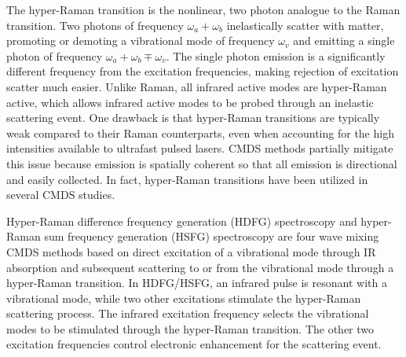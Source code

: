 \documentclass[aip, jcp, reprint, onecolumn]{revtex4-2}
\begin{document}
The hyper-Raman transition is the nonlinear, two photon analogue to the Raman transition.\cite{Terhune1965, Cyvin1965, Andrews1978}
Two photons of frequency $\omega_a+\omega_b$ inelastically scatter with matter, promoting or demoting a vibrational mode of frequency $\omega_v$ and emitting a single photon of frequency $\omega_a + \omega_b \mp \omega_v$.
The single photon emission is a significantly different frequency from the excitation frequencies, making rejection of excitation scatter much easier.
Unlike Raman, all infrared active modes are hyper-Raman active, which allows infrared active modes to be probed through an inelastic scattering event. \cite{Andrews1978}
One drawback is that hyper-Raman transitions are typically weak compared to their Raman counterparts, even when accounting for the high intensities available to ultrafast pulsed lasers.\cite{RN515, Kelley2010}
CMDS methods partially mitigate this issue because emission is spatially coherent so that all emission is directional and easily collected.
In fact, hyper-Raman transitions have been utilized in several CMDS studies.\cite{Zilian1994, RN350, RN416, RN351, RN352, RN353, Chen1998, RN362, RN418, Bonn2024, McDonnell2024,Wang2021}

Hyper-Raman difference frequency generation (HDFG) spectroscopy and hyper-Raman sum frequency generation (HSFG) spectroscopy are four wave mixing CMDS methods based on direct excitation of a vibrational mode through IR absorption and subsequent scattering to or from the vibrational mode through a hyper-Raman transition.
In HDFG/HSFG, an infrared pulse is resonant with a vibrational mode, while two other excitations stimulate the hyper-Raman scattering process.
The infrared excitation frequency selects the vibrational modes to be stimulated through the hyper-Raman transition.  
The other two excitation frequencies control electronic enhancement for the scattering event.
\end{document}
